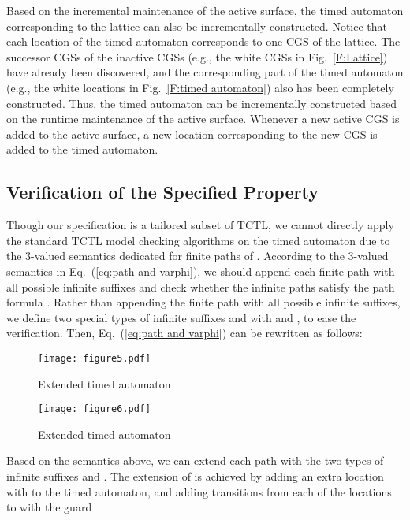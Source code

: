\documentclass[10pt,conference,compsocconf,letterpaper]{IEEEtran}
\begin{document}
Based on the incremental maintenance of the active surface, the timed automaton corresponding to the lattice can also be incrementally constructed. Notice that each location of the timed automaton corresponds to one CGS of the lattice. The successor CGSs of the inactive CGSs (e.g., the white CGSs in Fig.~\ref{F:Lattice}) have already been discovered, and the corresponding part of the timed automaton (e.g., the white locations in Fig.~\ref{F:timed automaton}) also has been completely constructed. Thus, the timed automaton can be incrementally constructed based on the runtime maintenance of the active surface. Whenever a new active CGS is added to the active surface, a new location corresponding to the new CGS is added to the timed automaton.

\subsection{Verification of the Specified Property}\label{sec:Detection over TA}

Though our specification is a tailored subset of TCTL, we cannot directly apply the standard TCTL model checking algorithms on the timed automaton  due to the 3-valued semantics dedicated for finite paths of . According to the 3-valued semantics in Eq.~(\ref{eq:path and varphi}), we should append each finite path  with all possible infinite suffixes  and check whether the infinite paths  satisfy the path formula . Rather than appending the finite path with all possible infinite suffixes, we define two special types of infinite suffixes  and  with  and , to ease the verification. Then, Eq.~(\ref{eq:path and varphi}) can be rewritten as follows:

\begin{figure}[tbp]
\begin{center}
  \texttt{[image: figure5.pdf]}
  \caption{Extended timed automaton }
  \label{F:extended true TA}
\end{center}
\end{figure}
\begin{figure}[tbp]
\begin{center}
  \texttt{[image: figure6.pdf]}
  \caption{Extended timed automaton }
  \label{F:extended false TA}
\end{center}
\end{figure}

Based on the semantics above, we can extend each path  with the two types of infinite suffixes  and . The extension of  is achieved by adding an extra location  with  to the timed automaton, and adding transitions from each of the locations  to  with the guard
\end{document}
